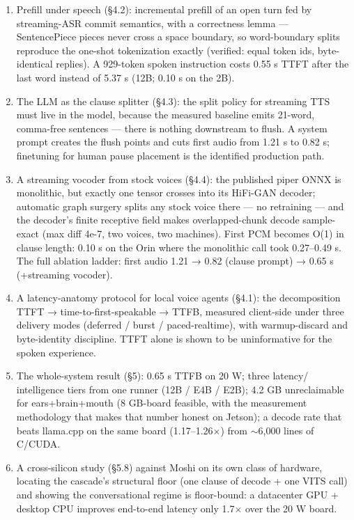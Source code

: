 \documentclass[journal]{IEEEtran}
\begin{document}
    \begin{enumerate}
        \item Prefill under speech (§4.2): incremental prefill of an open turn fed by streaming-ASR commit semantics, with a correctness lemma — SentencePiece pieces never cross a space boundary, so word-boundary splits reproduce the one-shot tokenization exactly (verified: equal token ids, byte-identical replies). A 929-token spoken instruction costs 0.55 s TTFT after the last word instead of 5.37 s (12B; 0.10 s on the 2B).
        \item The LLM as the clause splitter (§4.3): the split policy for streaming TTS must live in the model, because the measured baseline emits 21-word, comma-free sentences — there is nothing downstream to flush. A system prompt creates the flush points and cuts first audio from 1.21 s to 0.82 s; finetuning for human pause placement is the identified production path.
        \item A streaming vocoder from stock voices (§4.4): the published piper ONNX is monolithic, but exactly one tensor crosses into its HiFi-GAN decoder; automatic graph surgery splits any stock voice there — no retraining — and the decoder's finite receptive field makes overlapped-chunk decode sample-exact (max diff 4e-7, two voices, two machines). First PCM becomes O(1) in clause length: 0.10 s on the Orin where the monolithic call took 0.27–0.49 s. The full ablation ladder: first audio 1.21 → 0.82 (clause prompt) → 0.65 s (+streaming vocoder).
        \item A latency-anatomy protocol for local voice agents (§4.1): the decomposition TTFT → time-to-first-speakable → TTFB, measured client-side under three delivery modes (deferred / burst / paced-realtime), with warmup-discard and byte-identity discipline. TTFT alone is shown to be uninformative for the spoken experience.
        \item The whole-system result (§5): 0.65 s TTFB on 20 W; three latency/ intelligence tiers from one runner (12B / E4B / E2B); 4.2 GB unreclaimable for ears+brain+mouth (8 GB-board feasible, with the measurement methodology that makes that number honest on Jetson); a decode rate that beats llama.cpp on the same board (1.17–1.26×) from $\sim$6,000 lines of C/CUDA.
        \item A cross-silicon study (§5.8) against Moshi on its own class of hardware, locating the cascade's structural floor (one clause of decode + one VITS call) and showing the conversational regime is floor-bound: a datacenter GPU + desktop CPU improves end-to-end latency only 1.7× over the 20 W board.
    \end{enumerate}
\end{document}
